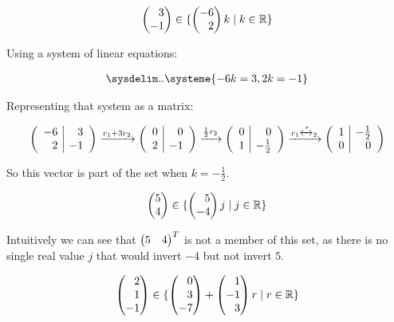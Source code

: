 \documentclass[12pt]{article}
\newenvironment{abc}{\begin{enumerate}[label={\bf(\alph*)}]}{\end{enumerate}}
\newcommand\m[2][]{
	\ifthenelse{\equal {#1} {}}
		{\begin{pmatrix*}[r]#2\end{pmatrix*}}
		{\left(\begin{array}{#1}#2\end{array}\right)}
}
\newcommand\resetequation[1][1]{\setcounter{equation}{#1 - 1}}
\begin{document}
\begin{abc}
	\begin{item}
	\resetequation
	\begin{equation}
	\begin{aligned}
		\m{3 \\ -1} \in \{ \m{-6 \\ 2}k \mid k \in \mathbb{R} \}
	\end{aligned}
	\end{equation}
	
	Using a system of linear equations:

	\begin{equation}
	\begin{aligned}
		\sysdelim..\systeme{-6k = 3, 2k = -1}
	\end{aligned}
	\end{equation}

	Representing that system as a matrix:

	\begin{equation}
	\begin{aligned}
		\m[r|r]{-6 & 3 \\ 2 & -1}
		\xrightarrow{r_1 + 3r_2}
		\m[r|r]{0 & 0 \\ 2 & -1}
		\xrightarrow{\frac{1}{2}r_2}
		\m[r|r]{0 & 0 \\ 1 & -\frac{1}{2}}
		\xrightarrow{r_1 \xleftrightarrow r_2}
		\m[r|r]{1 & -\frac{1}{2} \\ 0 & 0}
	\end{aligned}
	\end{equation}

	So this vector is part of the set when $k = -\frac{1}{2}$.
	\end{item}

	\begin{item}
	\begin{equation}
	\begin{aligned}
		\m{5 \\ 4} \in \{ \m{5 \\ -4}j \mid j \in \mathbb{R} \}
	\end{aligned}
	\end{equation}
	
	Intuitively we can see that $\m{5 & 4}^T$ is not a member of this set,
	as there is no single real value $j$ that would invert $-4$ but not
	invert $5$.
	\end{item}

	\begin{item}
	\begin{equation}
	\begin{aligned}
		\m{2 \\ 1 \\ -1} \in \{\m{0 \\ 3 \\ -7} + \m{1 \\ -1 \\ 3}r \mid r \in \mathbb{R} \}
	\end{aligned}
	\end{equation}


\end{item}
\end{abc}
\end{document}
